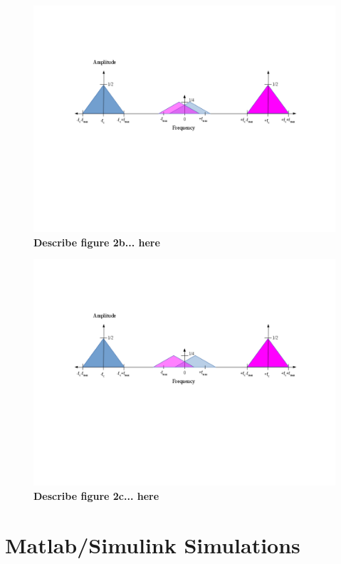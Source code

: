 \documentclass[letterpaper,12pt]{article}
\begin{document}
\begin{figure}[ht] 
\includegraphics[width=1.0\columnwidth]{prelab1-figure2b}
\caption{
\label{fig:hw1-figure2b}
{\bf Describe  figure 2b...
here}
}
\end{figure}

\begin{figure}[ht] 
\includegraphics[width=1.0\columnwidth]{prelab1-figure2c}
\caption{
\label{fig:hw1-figure2c}
{\bf Describe  figure 2c...
here}
}
\end{figure}


\section{Matlab/Simulink Simulations}
\end{document}
